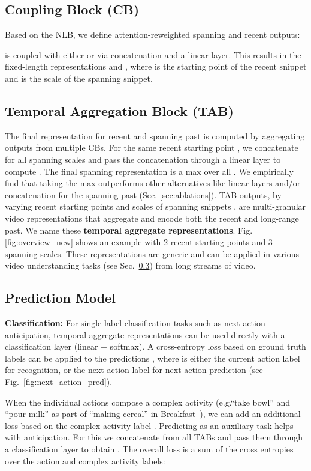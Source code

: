 \documentclass[runningheads]{llncs}
\makeatletter
\newcommand*{\eg}{e.g.\@\xspace}
\makeatother
\begin{document}
\subsection{Coupling Block (CB)}\label{sec:cb} 
Based on the NLB, we define attention-reweighted spanning and recent outputs:

\noindent  is coupled with either  or  via concatenation and a linear layer. This results in the fixed-length representations  and , where  is the starting point of the recent snippet and  is the scale of the spanning snippet. 
 
\subsection{Temporal Aggregation Block (TAB)}\label{sec:tab}
The final representation for recent and spanning past is computed by aggregating outputs from multiple CBs. For the same recent starting point , we concatenate   for all spanning scales and pass the concatenation through a linear layer to compute . The final spanning representation  is a max over all . We empirically find that taking the max outperforms other alternatives like linear layers and/or concatenation for the spanning past (Sec. \ref{sec:ablations}).  TAB outputs, by varying recent starting points  and scales of spanning snippets , are multi-granular video representations that aggregate and encode both the recent and long-range past. We name these \textbf{temporal aggregate representations}. Fig.\ref{fig:overview_new} shows an example with 2 recent starting points and 3 spanning scales. These representations are generic and can be applied in various video understanding tasks (see Sec.~\ref{sec:pred}) from long streams of video. 
 
\subsection{Prediction Model}\label{sec:pred}
\textbf{Classification:} For single-label classification tasks such as next action anticipation, temporal aggregate representations can be used directly with a classification layer (linear + softmax). A cross-entropy loss based on ground truth labels  can be applied to the predictions , where  is either the current action label for recognition, or the next action label for next action prediction (see Fig.~\ref{fig:next_action_pred}). 

When the individual actions compose a complex activity (\eg ``take bowl'' and ``pour milk'' as part of ``making cereal''  in Breakfast~\cite{kuehne2014language}), we can add an additional loss based on the complex activity label . Predicting  as an auxiliary task helps with anticipation. For this we concatenate  from all TABs and pass them through a classification layer to obtain . The overall loss is a sum of the cross entropies over the action and complex activity labels: 
\end{document}
